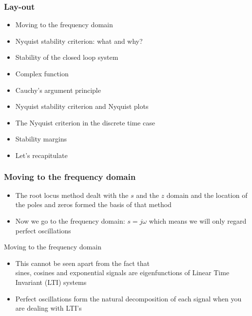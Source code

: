 

\begin{frame}
\frametitle{Lay-out}
\begin{itemize}
\item Moving to the frequency domain
\item Nyquist stability criterion: what and why?
\item Stability of the closed loop system
\item Complex function
\item Cauchy's argument principle
\item Nyquist stability criterion and Nyquist plots
\item The Nyquist criterion in the discrete time case
\item Stability margins
\item Let's recapitulate
\end{itemize}
\end{frame}

\begin{frame}
\frametitle{Moving to the frequency domain}
\begin{itemize}
\item The root locus method dealt with the $s$ and the $z$ domain and the
location of the poles and zeros formed the basis of that method
\vspace{1.5cm}
\item Now we go to the frequency domain: $s=j\omega$ which means
we will only regard perfect oscillations
\end{itemize}
\end{frame}

\begin{frame}{Moving to the frequency domain}
\begin{itemize}
\item This cannot be seen apart from the fact that \\sines, cosines
and exponential signals are eigenfunctions of Linear Time Invariant (LTI) systems
\vspace{1.5cm}
\item Perfect oscillations form the natural decomposition of each
signal when you are dealing with LTI's
\end{itemize}
\end{frame}

